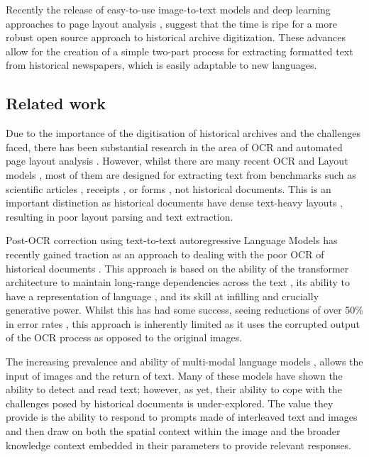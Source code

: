 \documentclass{article} %
\begin{document}
Recently the release of easy-to-use image-to-text models \cite{agrawal_pixtral_2024, wei_general_2024, beyer_paligemma_2024} and deep learning approaches to page layout analysis \cite{auer_docling_2024, dell_american_2024, almutairi_newspaper_2024}, suggest that the time is ripe for a more robust open source approach to historical archive digitization. These advances allow for the creation of a simple two-part process for extracting formatted text from historical newspapers, which is easily adaptable to new languages.


\subsection{Related work}

Due to the importance of the digitisation of historical archives and the challenges faced, there has been substantial research in the area of OCR and automated page layout analysis \cite{girdhar_digitizing_2024}. However, whilst there are many recent OCR and Layout models \cite{wei_general_2024, da_vision_2023, zhang_vsr_2021, li_dit_2022, huang_layoutlmv3_2022}, most of them are designed for extracting text from benchmarks such as scientific articles \cite{zhong_publaynet_2019}, receipts \cite{park_cord_2019}, or forms \cite{jaume_funsd_2019}, not historical documents. This is an important distinction as historical documents have dense text-heavy layouts \cite{sven_page_2022}, resulting in poor layout parsing and text extraction. 

Post-OCR correction using text-to-text autoregressive Language Models has recently gained traction as an approach to dealing with the poor OCR of historical documents \cite{boros_post-correction_2024, thomas_leveraging_2024, bourne_clocr-c_2024, bourne_scrambled_2024-1, kanerva_ocr_2025}. This approach is based on the ability of the transformer architecture to maintain long-range dependencies across the text \cite{vaswani_attention_2017}, its ability to have a representation of language \cite{kallini_mission_2024}, and its skill at infilling \cite{devlin_bert_2019} and crucially generative power. Whilst this has had some success, seeing reductions of over 50\% in error rates \cite{thomas_leveraging_2024, bourne_scrambled_2024-1}, this approach is inherently limited as it uses the corrupted output of the OCR process as opposed to the original images. 

The increasing prevalence and ability of multi-modal language models \cite{agrawal_pixtral_2024, team_gemini_2024, openai_gpt-4_2024, qwen_qwen25_2025, dubey_llama_2024}, allows the input of images and the return of text. Many of these models have shown the ability to detect and read text; however, as yet, their ability to cope with the challenges posed by historical documents is under-explored. The value they provide is the ability to respond to prompts made of interleaved text and images and then draw on both the spatial context within the image and the broader knowledge context embedded in their parameters to provide relevant responses. 
\end{document}

